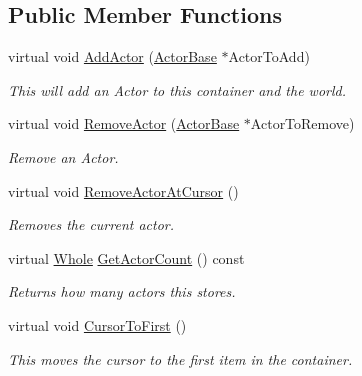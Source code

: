 \subsection*{Public Member Functions}
\begin{DoxyCompactItemize}
\item 
virtual void \hyperlink{classphys_1_1ActorContainerVector_a4bc3e38f16caddee021a97739bebaf6e}{AddActor} (\hyperlink{classphys_1_1ActorBase}{ActorBase} $\ast$ActorToAdd)
\begin{DoxyCompactList}\small\item\em This will add an Actor to this container and the world. \item\end{DoxyCompactList}\item 
virtual void \hyperlink{classphys_1_1ActorContainerVector_aeee5bd81601faed85e6a35f576c8d476}{RemoveActor} (\hyperlink{classphys_1_1ActorBase}{ActorBase} $\ast$ActorToRemove)
\begin{DoxyCompactList}\small\item\em Remove an Actor. \item\end{DoxyCompactList}\item 
virtual void \hyperlink{classphys_1_1ActorContainerVector_a430977daf010a25f53df6cf37954f8ca}{RemoveActorAtCursor} ()
\begin{DoxyCompactList}\small\item\em Removes the current actor. \item\end{DoxyCompactList}\item 
virtual \hyperlink{namespacephys_a460f6bc24c8dd347b05e0366ae34f34a}{Whole} \hyperlink{classphys_1_1ActorContainerVector_a6d2e5e68e23f5798ad10ba41e479d0f7}{GetActorCount} () const 
\begin{DoxyCompactList}\small\item\em Returns how many actors this stores. \item\end{DoxyCompactList}\item 
virtual void \hyperlink{classphys_1_1ActorContainerVector_ad9c2eb2a9405dcf687c86745afc9c031}{CursorToFirst} ()
\begin{DoxyCompactList}\small\item\em This moves the cursor to the first item in the container. \item\end{DoxyCompactList}\item 

\end{DoxyCompactItemize}
